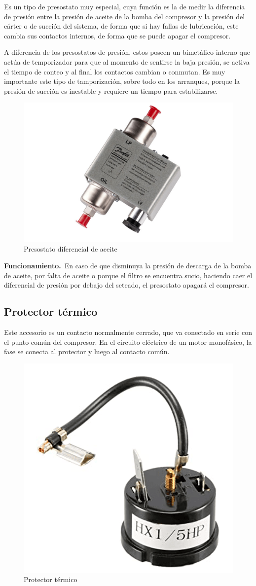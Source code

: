 Es un tipo de presostato muy especial, cuya funci\'on es la de medir la diferencia de presi\'on entre la presi\'on de aceite de la bomba del compresor y la presi\'on del c\'arter o de succi\'on del sistema, de forma que si hay fallas de lubricaci\'on, este cambia sus contactos internos, de forma que se puede apagar el compresor.

A diferencia de los presostatos de presi\'on, estos poseen un bimet\'alico interno que act\'ua de temporizador para que al momento de sentirse la baja presi\'on, se activa el tiempo de conteo y al final los contactos cambian o conmutan. Es muy importante este tipo de tamporizaci\'on, sobre todo en los arranques, porque la presi\'on de succi\'on es inestable y requiere un tiempo para estabilizarse. 

\begin{figure}[H]
    \centering
    \includegraphics[width=.6\linewidth]{figuras/control-seguridad/presostato-diferencial-aceite.jpg}
    \caption{Presostato diferencial de aceite}
\end{figure}

\textbf{Funcionamiento.}\ En caso de que disminuya la presi\'on de descarga de la bomba de aceite, por falta de aceite o porque el filtro se encuentra sucio, haciendo caer el diferencial de presi\'on por debajo del seteado, el presostato apagar\'a el compresor.

\subsection{Protector t\'ermico}

Este accesorio es un contacto normalmente cerrado, que va conectado en serie con el punto com\'un del compresor. En el circuito el\'ectrico de un motor monof\'asico, la fase se conecta al protector y luego al contacto com\'un.

\begin{figure}
    \centering
    \includegraphics[width=0.4\linewidth]{figuras/control-seguridad/protector-termico.png}
    \caption{Protector t\'ermico}
    \label{fig:protector-termico}
\end{figure}

